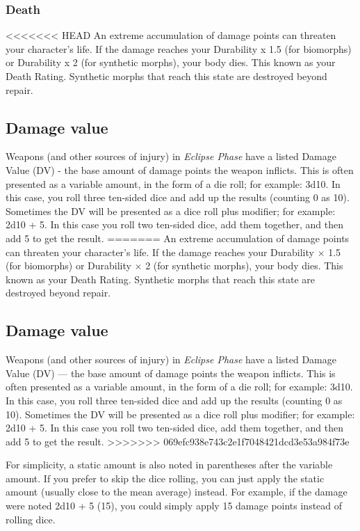 \subsubsection{Death}

<<<<<<< HEAD
An extreme accumulation of damage points can threaten your character’s life. If the damage reaches your Durability x 1.5 (for biomorphs) or Durability x 2 (for synthetic morphs), your body dies. This known as your Death Rating. Synthetic morphs that reach this state are destroyed beyond repair.

\subsection{Damage value}

Weapons (and other sources of injury) in \emph{Eclipse Phase} have a listed Damage Value (DV) - the base amount of damage points the weapon inflicts. This is often presented as a variable amount, in the form of a die roll; for example: 3d10. In this case, you roll three ten-sided dice and add up the results (counting 0 as 10). Sometimes the DV will be presented as a dice roll plus modifier; for example: 2d10 + 5. In this case you roll two ten-sided dice, add them together, and then add 5 to get the result.
=======
An extreme accumulation of damage points can threaten your character’s life. If the damage reaches your Durability $\times$ 1.5 (for biomorphs) or Durability $\times$ 2 (for synthetic morphs), your body dies. This known as your Death Rating. Synthetic morphs that reach this state are destroyed beyond repair.

\subsection{Damage value}

Weapons (and other sources of injury) in \emph{Eclipse Phase} have a listed Damage Value (DV) --- the base amount of damage points the weapon inflicts. This is often presented as a variable amount, in the form of a die roll; for example: 3d10. In this case, you roll three ten-sided dice and add up the results (counting 0 as 10). Sometimes the DV will be presented as a dice roll plus modifier; for example: 2d10 + 5. In this case you roll two ten-sided dice, add them together, and then add 5 to get the result.
>>>>>>> 069efc938e743c2e1f7048421dcd3e53a984f73e

For simplicity, a static amount is also noted in parentheses after the variable amount. If you prefer to skip the dice rolling, you can just apply the static amount (usually close to the mean average) instead. For example, if the damage were noted 2d10 + 5 (15), you could simply apply 15 damage points instead of rolling dice.

